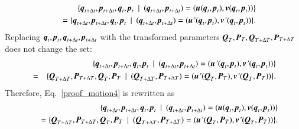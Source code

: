 \documentclass[preprint,
bibnotes,
 amsmath,amssymb,
 aps,
]{revtex4-1}
\newcounter{num}
\begin{document}
\begin{eqnarray}
&\:&\{\textit{\textbf{q}}_{t+\Delta t},\textit{\textbf{p}}_{t+\Delta t},\textit{\textbf{q}}_{t},\textit{\textbf{p}}_{t}\:\mid \: (\textit{\textbf{q}}_{t+\Delta t},\textit{\textbf{p}}_{t+\Delta t}) = (\textit{\textbf{u}}(\textit{\textbf{q}}_{t},\textit{\textbf{p}}_{t}),\textit{\textbf{v}}(\textit{\textbf{q}}_{t},\textit{\textbf{p}}_{t}))\}\nonumber\\
&\:&\:= \{\textit{\textbf{q}}_{t+\Delta t},\textit{\textbf{p}}_{t+\Delta t},\textit{\textbf{q}}_{t},\textit{\textbf{p}}_{t}\:\mid \: (\textit{\textbf{q}}_{t+\Delta t},\textit{\textbf{p}}_{t+\Delta t}) = (\textit{\textbf{u}'}(\textit{\textbf{q}}_{t},\textit{\textbf{p}}_{t}),\textit{\textbf{v}'}(\textit{\textbf{q}}_{t},\textit{\textbf{p}}_{t}))\}.\label{proof_motion4}
\end{eqnarray}
Replacing $\textit{\textbf{q}}_t,\textit{\textbf{p}}_t,\textit{\textbf{q}}_{t+\Delta t},\textit{\textbf{p}}_{t+\Delta t}$ with the transformed parameters $\textit{\textbf{Q}}_{T},\textit{\textbf{P}}_{T},\textit{\textbf{Q}}_{T+\Delta T},\textit{\textbf{P}}_{T+\Delta T}$ does not change the set: 
\begin{eqnarray}
&\:&\{\textit{\textbf{q}}_{t+\Delta t},\textit{\textbf{p}}_{t+\Delta t},\textit{\textbf{q}}_{t},\textit{\textbf{p}}_{t}\:\mid \: (\textit{\textbf{q}}_{t+\Delta t},\textit{\textbf{p}}_{t+\Delta t}) = (\textit{\textbf{u}'}(\textit{\textbf{q}}_{t},\textit{\textbf{p}}_{t}),\textit{\textbf{v}'}(\textit{\textbf{q}}_{t},\textit{\textbf{p}}_{t}))\}\\
&=& \{\textit{\textbf{Q}}_{T+\Delta T},\textit{\textbf{P}}_{T+\Delta T},\textit{\textbf{Q}}_{T},\textit{\textbf{P}}_{T}\:\mid \: (\textit{\textbf{Q}}_{T+\Delta T},\textit{\textbf{P}}_{T+\Delta T}) = (\textit{\textbf{u}'}(\textit{\textbf{Q}}_{T},\textit{\textbf{P}}_{T}),\textit{\textbf{v}'}(\textit{\textbf{Q}}_{T},\textit{\textbf{P}}_{T}))\}.
\end{eqnarray}
Therefore, Eq.~\eqref{proof_motion4} is rewritten as 
\begin{eqnarray}
&\:&\{\textit{\textbf{q}}_{t+\Delta t},\textit{\textbf{p}}_{t+\Delta t},\textit{\textbf{q}}_{t},\textit{\textbf{p}}_{t}\:\mid \: (\textit{\textbf{q}}_{t+\Delta t},\textit{\textbf{p}}_{t+\Delta t}) = (\textit{\textbf{u}}(\textit{\textbf{q}}_{t},\textit{\textbf{p}}_{t}),\textit{\textbf{v}}(\textit{\textbf{q}}_{t},\textit{\textbf{p}}_{t}))\}\nonumber\\
&\:&\:= \{\textit{\textbf{Q}}_{T+\Delta T},\textit{\textbf{P}}_{T+\Delta T},\textit{\textbf{Q}}_{T},\textit{\textbf{P}}_{T}\:\mid \: (\textit{\textbf{Q}}_{T+\Delta T},\textit{\textbf{P}}_{T+\Delta T}) = (\textit{\textbf{u}'}(\textit{\textbf{Q}}_{T},\textit{\textbf{P}}_{T}),\textit{\textbf{v}'}(\textit{\textbf{Q}}_{T},\textit{\textbf{P}}_{T}))\}.
\label{proof5}
\end{eqnarray}
\end{document}
